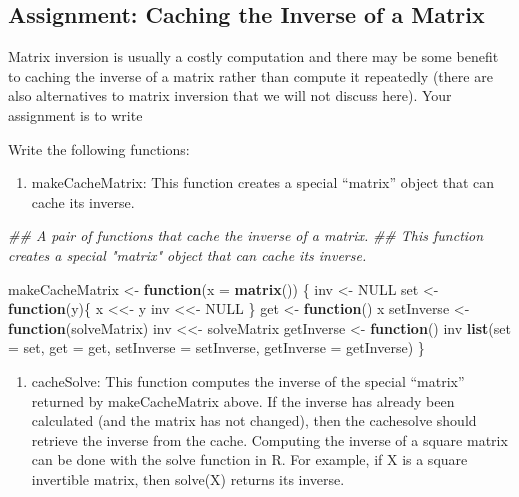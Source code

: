 \documentclass[
]{article}
\newenvironment{Shaded}{\begin{snugshade}}{\end{snugshade}}
\newcommand{\CommentTok}[1]{\textcolor[rgb]{0.56,0.35,0.01}{\textit{#1}}}
\newcommand{\ControlFlowTok}[1]{\textcolor[rgb]{0.13,0.29,0.53}{\textbf{#1}}}
\newcommand{\DataTypeTok}[1]{\textcolor[rgb]{0.13,0.29,0.53}{#1}}
\newcommand{\KeywordTok}[1]{\textcolor[rgb]{0.13,0.29,0.53}{\textbf{#1}}}
\newcommand{\NormalTok}[1]{#1}
\newcommand{\OtherTok}[1]{\textcolor[rgb]{0.56,0.35,0.01}{#1}}
\newcommand{\StringTok}[1]{\textcolor[rgb]{0.31,0.60,0.02}{#1}}
\providecommand{\tightlist}{%
  \setlength{\itemsep}{0pt}\setlength{\parskip}{0pt}}
\begin{document}
\hypertarget{assignment-caching-the-inverse-of-a-matrix}{%
\subsection{Assignment: Caching the Inverse of a
Matrix}\label{assignment-caching-the-inverse-of-a-matrix}}

Matrix inversion is usually a costly computation and there may be some
benefit to caching the inverse of a matrix rather than compute it
repeatedly (there are also alternatives to matrix inversion that we will
not discuss here). Your assignment is to write

Write the following functions:

\begin{enumerate}
\def\labelenumi{\arabic{enumi}.}
\tightlist
\item
  makeCacheMatrix: This function creates a special ``matrix'' object
  that can cache its inverse.
\end{enumerate}

\begin{Shaded}
\begin{Highlighting}[]
\CommentTok{\#\# A pair of functions that cache the inverse of a matrix.}
\CommentTok{\#\# This function creates a special "matrix" object that can cache its inverse.}

\NormalTok{makeCacheMatrix \textless{}{-}}\StringTok{ }\ControlFlowTok{function}\NormalTok{(}\DataTypeTok{x =} \KeywordTok{matrix}\NormalTok{()) \{}
\NormalTok{  inv \textless{}{-}}\StringTok{ }\OtherTok{NULL}
\NormalTok{  set \textless{}{-}}\StringTok{ }\ControlFlowTok{function}\NormalTok{(y)\{}
\NormalTok{    x \textless{}\textless{}{-}}\StringTok{ }\NormalTok{y}
\NormalTok{    inv \textless{}\textless{}{-}}\StringTok{ }\OtherTok{NULL}
\NormalTok{  \}}
\NormalTok{  get \textless{}{-}}\StringTok{ }\ControlFlowTok{function}\NormalTok{() x}
\NormalTok{  setInverse \textless{}{-}}\StringTok{ }\ControlFlowTok{function}\NormalTok{(solveMatrix) inv \textless{}\textless{}{-}}\StringTok{ }\NormalTok{solveMatrix}
\NormalTok{  getInverse \textless{}{-}}\StringTok{ }\ControlFlowTok{function}\NormalTok{() inv}
  \KeywordTok{list}\NormalTok{(}\DataTypeTok{set =}\NormalTok{ set, }\DataTypeTok{get =}\NormalTok{ get, }\DataTypeTok{setInverse =}\NormalTok{ setInverse, }\DataTypeTok{getInverse =}\NormalTok{ getInverse)}
\NormalTok{\}}
\end{Highlighting}
\end{Shaded}

\begin{enumerate}
\def\labelenumi{\arabic{enumi}.}
\setcounter{enumi}{1}
\tightlist
\item
  cacheSolve: This function computes the inverse of the special
  ``matrix'' returned by makeCacheMatrix above. If the inverse has
  already been calculated (and the matrix has not changed), then the
  cachesolve should retrieve the inverse from the cache. Computing the
  inverse of a square matrix can be done with the solve function in R.
  For example, if X is a square invertible matrix, then solve(X) returns
  its inverse.
\end{enumerate}
\end{document}
